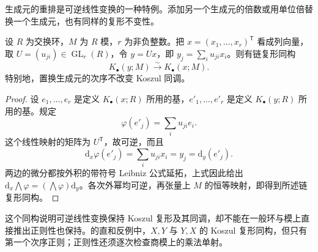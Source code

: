 \ProseParagraphBreak
生成元的重排是可逆线性变换的一种特例。添加另一个生成元的倍数或用单位倍替换一个生成元，也有同样的复形不变性。

\begin{proposition}[生成元的可逆线性变换]\label{b3:prop:koszul-generator-change}
	设 \(R\) 为交换环，\(M\) 为 \(R\) 模，\(r\) 为非负整数。把 \(x=(x_1,\ldots,x_r)^{\mathsf T}\) 看成列向量，取 \(U=(u_{ji})\in\operatorname{GL}_r(R)\)，令 \(y=Ux\)，即 \(y_j=\sum_i u_{ji}x_i\)。则有链复形同构
	\[
		K_\bullet(y;M)\xrightarrow{\sim}K_\bullet(x;M).
	\]
	特别地，置换生成元的次序不改变 Koszul 同调。
\end{proposition}
\begin{proof}
	设 \(e_1,\ldots,e_r\) 是定义 \(K_\bullet(x;R)\) 所用的基，\(e'_1,\ldots,e'_r\) 是定义 \(K_\bullet(y;R)\) 所用的基。规定
	\[
		\varphi(e'_j)=\sum_i u_{ji}e_i.
	\]
	这个线性映射的矩阵为 \(U^{\mathsf T}\)，故可逆，而且
	\[
		\mathrm{d}_x\varphi(e'_j)=\sum_i u_{ji}x_i=y_j =\mathrm{d}_y(e'_j).
	\]
	两边的微分都按外积的带符号 Leibniz 公式延拓，上式因此给出 \(\mathrm{d}_x\bigwedge\varphi=(\bigwedge\varphi)\mathrm{d}_y\)。各次外幂均可逆，再张量上 \(M\) 的恒等映射，即得到所述链复形同构。
\end{proof}

这个同构说明可逆线性变换保持 Koszul 复形及其同调，却不能在一般环与模上直接推出正则性也保持。的直和反例中，\(X,Y\) 与 \(Y,X\) 的 Koszul 复形同构，但只有第一个次序正则；正则性还须逐次检查商模上的乘法单射。
